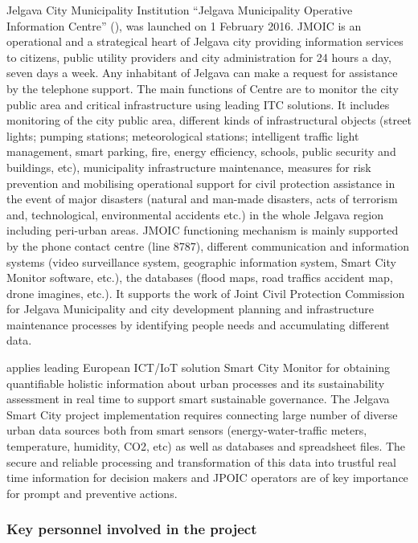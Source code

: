 \documentclass[a4paper,11pt]{article}
\begin{document}
Jelgava City Municipality Institution ``Jelgava Municipality Operative Information Centre'' (\JMOICshort), was launched on 1 February 2016.  JMOIC is an operational and a strategical heart of Jelgava city providing information services to citizens, public utility providers and city administration for 24 hours a day, seven days a week. Any inhabitant of Jelgava can make a request for assistance by the telephone support. The main functions of Centre are to monitor the city public area and critical infrastructure using leading ITC solutions. It includes monitoring of the city public area, different kinds of infrastructural objects (street lights; pumping stations; meteorological stations; intelligent traffic light management, smart parking, fire, energy efficiency, schools, public security and buildings, etc), municipality infrastructure maintenance, measures for risk prevention and mobilising operational support for civil protection assistance in the event of major disasters (natural and man-made disasters, acts of terrorism and, technological, environmental accidents etc.) in the whole Jelgava region including peri-urban areas. 
JMOIC functioning mechanism is mainly supported by the phone contact centre (line 8787), different communication and information systems (video surveillance system, geographic information system, Smart City Monitor software, etc.), the databases (flood maps, road traffics accident map, drone imagines, etc.). It supports the work of Joint Civil Protection Commission for Jelgava Municipality and city development planning and infrastructure maintenance processes by identifying people needs and accumulating different data.

\JMOICshort{} applies leading European ICT/IoT solution Smart City Monitor for obtaining quantifiable holistic information about urban processes and its sustainability assessment in real time to support smart sustainable governance. The Jelgava Smart City project implementation requires connecting large number of diverse urban data sources both from smart sensors (energy-water-traffic meters, temperature, humidity, CO2, etc) as well as databases and spreadsheet files. The secure and reliable processing and transformation of this data into trustful real time information for decision makers and JPOIC operators are of key importance for prompt and preventive actions.   


\bigskip
\subsubsection*{Key personnel involved in the project}
\end{document}
